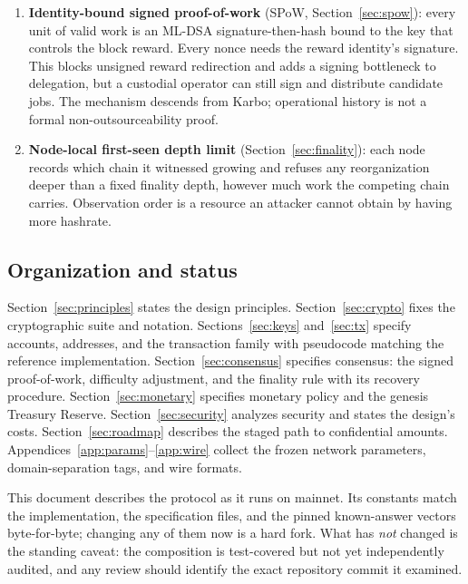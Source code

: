 \documentclass[11pt,a4paper]{article}
\begin{document}
\begin{enumerate}
\item \textbf{Identity-bound signed proof-of-work} (SPoW,
      Section~\ref{sec:spow}): every unit of valid work is an ML-DSA
      signature-then-hash bound to the key that controls the block reward.
      Every nonce needs the reward identity's signature. This blocks unsigned
      reward redirection and adds a signing bottleneck to delegation, but a
      custodial operator can still sign and distribute candidate jobs. The
      mechanism descends from Karbo; operational history is not a formal
      non-outsourceability proof.
\item \textbf{Node-local first-seen depth limit}
      (Section~\ref{sec:finality}): each node records which chain it
      witnessed growing and refuses any reorganization deeper than a fixed
      finality depth, however much work the competing chain carries.
      Observation order is a resource an attacker cannot obtain by having more
      hashrate.
\end{enumerate}

\subsection{Organization and status}

Section~\ref{sec:principles} states the design principles.
Section~\ref{sec:crypto} fixes the cryptographic suite and notation.
Sections~\ref{sec:keys} and~\ref{sec:tx} specify accounts, addresses, and the
transaction family with pseudocode matching the reference implementation.
Section~\ref{sec:consensus} specifies consensus: the signed proof-of-work,
difficulty adjustment, and the finality rule with its recovery procedure.
Section~\ref{sec:monetary} specifies monetary policy and the genesis Treasury
Reserve. Section~\ref{sec:security} analyzes security and states the design's
costs. Section~\ref{sec:roadmap} describes the staged path to confidential
amounts. Appendices~\ref{app:params}--\ref{app:wire} collect the frozen
network parameters, domain-separation tags, and wire formats.

This document describes the protocol as it runs on mainnet. Its constants match
the implementation, the specification files, and the pinned known-answer vectors
byte-for-byte; changing any of them now is a hard fork. What has \emph{not}
changed is the standing caveat: the composition is test-covered but not yet
independently audited, and any review should identify the exact repository
commit it examined.
\end{document}
